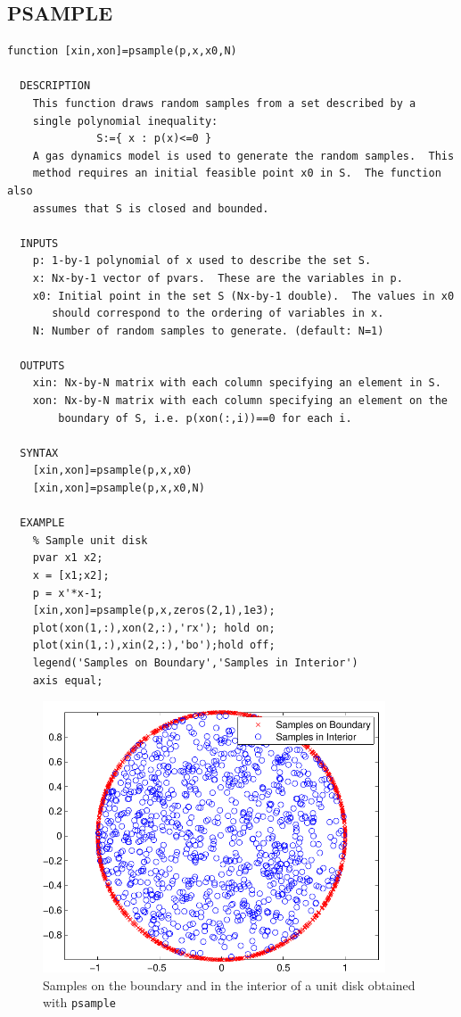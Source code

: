\documentclass{article}
\begin{document}
\subsection{PSAMPLE}
\begin{verbatim}
function [xin,xon]=psample(p,x,x0,N)

  DESCRIPTION
    This function draws random samples from a set described by a
    single polynomial inequality:
              S:={ x : p(x)<=0 }
    A gas dynamics model is used to generate the random samples.  This
    method requires an initial feasible point x0 in S.  The function also
    assumes that S is closed and bounded.

  INPUTS
    p: 1-by-1 polynomial of x used to describe the set S.
    x: Nx-by-1 vector of pvars.  These are the variables in p.
    x0: Initial point in the set S (Nx-by-1 double).  The values in x0
       should correspond to the ordering of variables in x.
    N: Number of random samples to generate. (default: N=1)

  OUTPUTS
    xin: Nx-by-N matrix with each column specifying an element in S.
    xon: Nx-by-N matrix with each column specifying an element on the
        boundary of S, i.e. p(xon(:,i))==0 for each i.

  SYNTAX
    [xin,xon]=psample(p,x,x0)
    [xin,xon]=psample(p,x,x0,N)

  EXAMPLE
    % Sample unit disk
    pvar x1 x2;
    x = [x1;x2];
    p = x'*x-1;
    [xin,xon]=psample(p,x,zeros(2,1),1e3);
    plot(xon(1,:),xon(2,:),'rx'); hold on;
    plot(xin(1,:),xin(2,:),'bo');hold off;
    legend('Samples on Boundary','Samples in Interior')
    axis equal;
\end{verbatim}


\newpage
\begin{figure}[h]
\begin{center}
\includegraphics[width=4in]{figs/psamplePLOT.pdf}
\caption{Samples on the boundary and in the interior of a unit disk
obtained with \texttt{psample}}
\end{center}
\end{figure}
\end{document}
